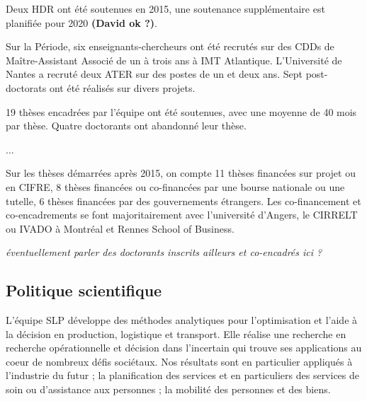 Deux HDR ont été soutenues en 2015, une soutenance supplémentaire est planifiée pour 2020\textbf{ (David ok ?)}.

Sur la Période, six enseignants-chercheurs ont été recrutés sur des CDDs de Maître-Assistant Associé de un à trois ans à IMT Atlantique. 
L'Université de Nantes a recruté deux ATER sur des postes de un et deux ans.
Sept post-doctorats ont été réalisés sur divers projets.


19 thèses encadrées par l'équipe ont été soutenues, avec une moyenne de 40 mois par thèse. 
Quatre doctorants ont abandonné leur thèse. 

...

Sur les thèses démarrées après 2015, on compte 11 thèses financées sur projet ou en CIFRE, 8 thèses financées ou co-financées par une bourse nationale ou une tutelle,
6 thèses financées par des gouvernements étrangers.
Les co-financement et co-encadrements se font majoritairement avec l'université d'Angers, le CIRRELT ou IVADO à Montréal et Rennes School of Business. 

\textit{ éventuellement parler des doctorants inscrits ailleurs et co-encadrés ici ?
}
\subsection{Politique scientifique}
  

L'équipe SLP développe des méthodes analytiques pour l'optimisation et l'aide à la décision en production, logistique et transport. 
Elle réalise une recherche en recherche opérationnelle et décision dans l'incertain qui trouve ses applications au coeur de nombreux défis sociétaux.
Nos résultats sont en particulier appliqués à l'industrie du futur ; la planification des services et en particuliers des services de soin ou d'assistance aux personnes ; la mobilité des personnes et des biens.


